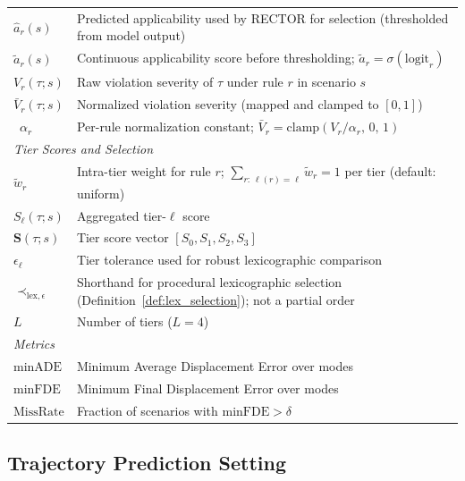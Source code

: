 \begin{table}
\begin{tabular}{ll}
$\hat{a}_r(s)$ & Predicted applicability used by RECTOR for selection (thresholded from model output) \\
$\tilde{a}_r(s)$ & Continuous applicability score before thresholding; $\tilde{a}_r = \sigma(\text{logit}_r)$ \\
$V_r(\tau; s)$ & Raw violation severity of $\tau$ under rule $r$ in scenario $s$ \\
$\bar{V}_r(\tau; s)$ & Normalized violation severity (mapped and clamped to $[0,1]$) \\\
$\alpha_r$ & Per-rule normalization constant; $\bar{V}_r = \mathrm{clamp}(V_r / \alpha_r,\,0,\,1)$ \\
\midrule
\multicolumn{2}{l}{\textit{Tier Scores and Selection}} \\
$\tilde{w}_r$ & Intra-tier weight for rule $r$; $\sum_{r:\,\ell(r)=\ell}\tilde{w}_r=1$ per tier (default: uniform) \\
$S_\ell(\tau; s)$ & Aggregated tier-$\ell$ score \\
$\mathbf{S}(\tau; s)$ & Tier score vector $[S_0,S_1,S_2,S_3]$ \\
$\epsilon_\ell$ & Tier tolerance used for robust lexicographic comparison \\
$\prec_{\text{lex},\epsilon}$ & Shorthand for procedural lexicographic selection (Definition~\ref{def:lex_selection}); not a partial order \\
$L$ & Number of tiers ($L=4$) \\
\midrule
\multicolumn{2}{l}{\textit{Metrics}} \\
$\text{minADE}$ & Minimum Average Displacement Error over modes \\
$\text{minFDE}$ & Minimum Final Displacement Error over modes \\
$\text{MissRate}$ & Fraction of scenarios with $\text{minFDE} > \delta$ \\
\bottomrule
\end{tabular}
\end{table}

\subsection{Trajectory Prediction Setting}
\label{subsec:prediction_setting}

